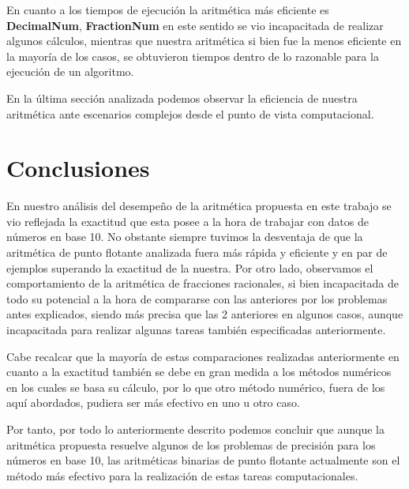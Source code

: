 \documentclass[a4paper,10pt,twocolumn]{article}
\begin{document}
	En cuanto a los tiempos de ejecución la aritmética más eficiente es \textbf{DecimalNum}, \textbf{FractionNum} en este sentido se vio incapacitada de realizar algunos cálculos, mientras que nuestra aritmética si bien fue la menos eficiente en la mayoría de los casos, se obtuvieron tiempos dentro de lo razonable para la ejecución de un algoritmo.
	
	En la última sección analizada podemos observar la eficiencia de nuestra aritmética ante escenarios complejos desde el punto de vista computacional.



\section{Conclusiones}\label{sec:conc}

  En nuestro análisis del desempeño de la aritmética propuesta en este trabajo se vio reflejada la exactitud que esta posee a la hora de trabajar con datos de números en base 10. No obstante siempre tuvimos la desventaja de que la aritmética de punto flotante analizada fuera más rápida y eficiente y en par de ejemplos superando la exactitud de la nuestra. Por otro lado, observamos el comportamiento de la aritmética de fracciones racionales, si bien incapacitada de todo su potencial a la hora de compararse con las anteriores por los problemas antes explicados, siendo más precisa que las 2 anteriores en algunos casos, aunque incapacitada para realizar algunas tareas también especificadas anteriormente.
  
  Cabe recalcar que la mayoría de estas comparaciones realizadas anteriormente en cuanto a la exactitud también se debe en gran medida a los métodos numéricos en los cuales se basa su cálculo, por lo que otro método numérico, fuera de los aquí abordados, pudiera ser más efectivo en uno u otro caso. 
  
  Por tanto, por todo lo anteriormente descrito podemos concluir que aunque la aritmética propuesta resuelve algunos de los problemas de precisión para los números en base 10, las aritméticas binarias de punto flotante actualmente son el método más efectivo para la realización de estas tareas computacionales.

\end{document}
